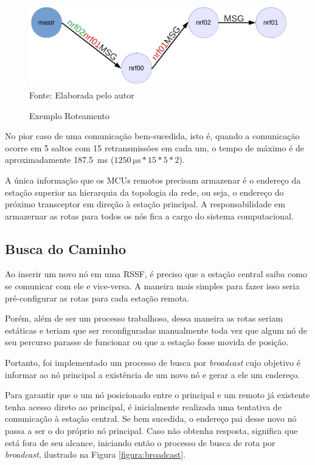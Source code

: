 {\begin{figure}[h!]
	\caption{Exemplo Roteamento}
	\centering
	\includegraphics[scale=0.5]{../images/roteamento.png}
	\hspace{\linewidth}
	Fonte: Elaborada pelo autor
	\label{figura:route}
\end{figure}

No pior caso de uma comunicação bem-sucedida, isto é, quando a comunicação ocorre em 5 saltos com 15
retransmissões em cada um, o tempo de máximo é de aproximadamente \SI{187.5}{\milli \second}
($\SI{1250}{\micro \second} * 15 * 5 * 2$).

A única informação que os MCUs remotos precisam armazenar é o endereço da estação superior na hierarquia da
topologia da rede, ou seja, o endereço do próximo transceptor em direção à estação principal. A
responsabilidade em armazernar as rotas para todos os nós fica a cargo do sistema computacional.

\subsection{Busca do Caminho}
Ao inserir um novo nó em uma RSSF, é preciso que a estação central saiba como se comunicar com ele e
vice-versa. A maneira mais simples para fazer isso seria pré-configurar as rotas para cada estação remota.

Porém, além de ser um processo trabalhoso, dessa maneira as rotas seriam estáticas e teriam que ser
reconfiguradas manualmente toda vez que algum nó de seu percurso parasse de funcionar ou que a estação fosse
movida de posição.

Portanto, foi implementado um processo de busca por \textit{broadcast} cujo objetivo é informar ao nó
principal a existência de um novo nó e gerar a ele um endereço.

Para garantir que o um nó posicionado entre o principal e um remoto já existente tenha acesso direto ao
principal, é inicialmente realizada uma tentativa de comunicação à estação central. Se bem sucedida, o
endereço pai desse novo nó passa a ser o do próprio nó principal. Caso não obtenha resposta, significa que
está fora de seu alcance, iniciando então o processo de busca de rota por \textit{broadcast}, ilustrado na
Figura \ref{figura:broadcast}.

}
